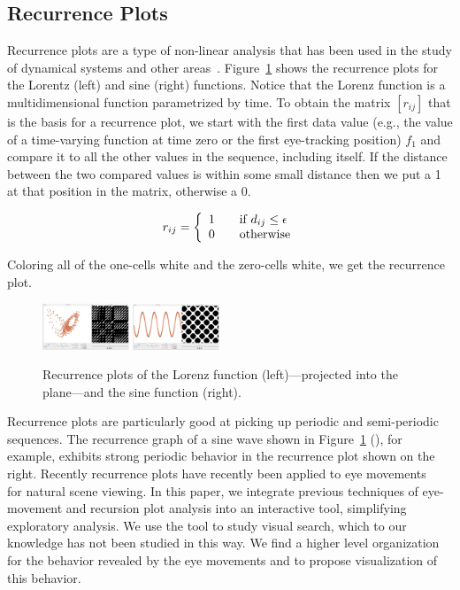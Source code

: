 \documentclass[journal]{vgtc}                %
\begin{document}
\subsection{Recurrence Plots} 

Recurrence  plots are a type of non-linear
analysis that has been used in the study of dynamical systems and other
areas~\cite{Eckmann_1987,Marwan_2008}.  Figure~\ref{fig:mathfuncs} 
shows the recurrence plots for the Lorentz (left) and sine (right) functions. 
Notice that the Lorenz function  is a multidimensional function
parametrized by time. To obtain the matrix $[r_{ij}]$ that is the basis for
a recurrence plot, we start with the first data value (e.g., the value of 
a time-varying function at time zero or  the first eye-tracking position) $f_1$  
and compare it to all the other values in the sequence, including itself. If the
distance  between the two compared values  is within some small
distance then we  put a 1 at that position in the matrix, otherwise a $0$. 

\[ 
r_{ij} = \left\{
	\begin{array}{l l} 
    1  & \quad \text{if $d_{ij} \leq \epsilon$}\\ 
    0  & \quad \text{otherwise} 
    \end{array} \right. 
\]

Coloring all of the one-cells white and the zero-cells white, we get
the recurrence plot.

\begin{figure}
\includegraphics[width=0.23\textwidth]{figures/lorenz.pdf}
\includegraphics[width=0.23\textwidth]{figures/sine.pdf}
	\caption{ Recurrence plots of the Lorenz function (left)---projected into the
		plane---and the sine function (right).\label{fig:mathfuncs}}
\end{figure}

Recurrence plots are particularly good at picking up
periodic and semi-periodic sequences. The recurrence graph of a sine wave
shown in Figure~\ref{fig:mathfuncs} (), for example, exhibits strong
periodic behavior in the recurrence plot shown on the right. Recently
recurrence plots have recently been applied to eye movements
~\cite{Anderson_2013} for natural scene viewing. In this paper, we integrate previous
techniques of eye-movement and recursion plot analysis into an interactive
tool, simplifying exploratory analysis. We use the tool to study visual
search, which to our knowledge has not been studied in this way. 
We find  a higher level organization for the behavior revealed by 
the eye movements and to propose visualization of this behavior.  
\end{document}
